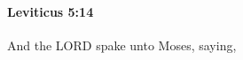 
		\paragraph{Leviticus 5:14} %
			\label{LEVITICUS-5-14}

			And the LORD spake unto Moses, saying,


